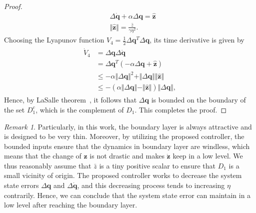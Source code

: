 \documentclass[3p]{elsarticle}
\theoremstyle{plain}
\theoremstyle{remark}
\newtheorem{myrem}{Remark}
\begin{document}
{\begin{proof}
\begin{align}
&\Delta \dot {\bm q}+\alpha\Delta\bm q=\hat{\bm z}\\
&\Vert\hat{\bm z}\Vert=\frac{\bar z}{\gamma\eta^2}.
\end{align}
Choosing the Lyapunov function $V_4=\frac{1}{2}\Delta\bm q^T\Delta\bm q$, its time derivative is given by
\begin{align}\begin{split}
\dot V_4 &= \Delta\bm q\Delta\dot{\bm q}\\
&=\Delta\bm q^T(-\alpha\Delta\bm q+\hat{\bm z})\\
&\le-\alpha\Vert\Delta\bm q\Vert^2+\Vert\Delta\bm q\Vert\Vert\hat{\bm z}\Vert\\
&\le-(\alpha\Vert\Delta\bm q\Vert-\Vert\hat{\bm z}\Vert)\Vert\Delta\bm q\Vert,
\end{split}\end{align}
Hence, by LaSalle theorem~\cite{lasalle1960some}, it follows that $\Delta\bm q$ is bounded on the boundary of the set $D_1^c$, which is the complement of $D_1$. This completes the proof.
\end{proof}
}
\begin{myrem}
Particularly, in this work, the boundary layer is always attractive and is designed to be very thin. Moreover, by utilizing the proposed controller, the bounded inputs ensure that the dynamics in boundary layer are windless, which means that the change of $\bm z$ is not drastic and makes $\dot{\bm z}$ keep in a low level. We thus reasonably assume that $\bar z$ is a tiny positive scalar to ensure that $D_1$ is a small vicinity of origin. The proposed controller works to decrease the system state errors $\Delta\bm q$ and $\Delta\dot{\bm q}$, and this decreasing process tends to increasing $\eta$ contrarily. Hence, we can conclude that the system state error can maintain in a low level after reaching the boundary layer.
\end{myrem}
\end{document}
